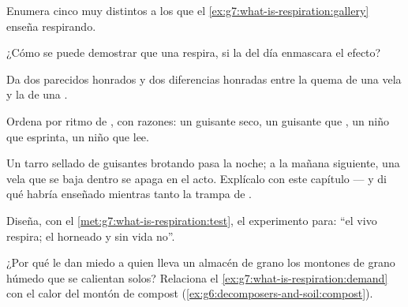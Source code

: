\begin{exercise}[$\star$]\label{exo:g7:what-is-respiration:5}
Enumera cinco  muy distintos a los que el
\cref{ex:g7:what-is-respiration:gallery} enseña respirando.
\end{exercise}

\begin{exercise}[$\star$]\label{exo:g7:what-is-respiration:6}
¿Cómo se puede demostrar que una  respira, si la  del día
enmascara el efecto?
\end{exercise}

\begin{exercise}[$\star\star$]\label{exo:g7:what-is-respiration:7}
Da dos parecidos honrados y dos diferencias honradas entre la quema de
una vela y la  de una .
\end{exercise}

\begin{exercise}[$\star\star$]\label{exo:g7:what-is-respiration:8}
Ordena por ritmo de , con razones: un guisante seco, un
guisante que , un niño que esprinta, un niño que lee.
\end{exercise}

\begin{exercise}[$\star\star$]\label{exo:g7:what-is-respiration:9}
Un tarro sellado de guisantes brotando pasa la noche; a la mañana
siguiente, una vela que se baja dentro se apaga en el acto. Explícalo
con este capítulo --- y di qué habría enseñado mientras tanto la trampa
de .
\end{exercise}

\begin{exercise}[$\star\star$]\label{exo:g7:what-is-respiration:10}
Diseña, con el \cref{met:g7:what-is-respiration:test}, el experimento
para: ``el  vivo respira; el  horneado y sin vida no''.
\end{exercise}

\begin{exercise}[$\star\star$]\label{exo:g7:what-is-respiration:11}
¿Por qué le dan miedo a quien lleva un almacén de grano los montones de
grano húmedo que se calientan solos? Relaciona el
\cref{ex:g7:what-is-respiration:demand} con el calor del montón de
compost (\cref{ex:g6:decomposers-and-soil:compost}).
\end{exercise}

